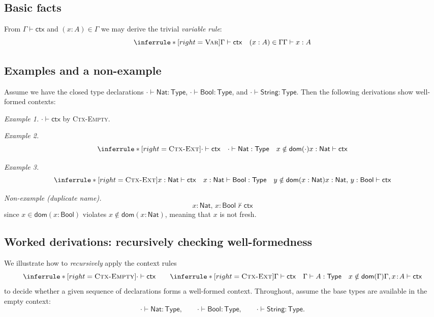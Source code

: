 \documentclass{article}
\newcommand{\Type}{\mathsf{Type}}
\newcommand{\Nat}{\mathsf{Nat}}
\newcommand{\Bool}{\mathsf{Bool}}
\newcommand{\String}{\mathsf{String}}
\newcommand{\emptyctx}{\cdot}              %
\newcommand{\ctx}{\mathsf{ctx}}            %
\newcommand{\judg}[3]{#1 \vdash #2 : #3}   %
\newcommand{\dom}{\mathsf{dom}}            %
\newcommand{\rulename}[1]{\textsc{#1}}
\begin{document}
\subsection*{Basic facts}
From \(\Gamma \vdash \ctx\) and \((x:A)\in\Gamma\) we may derive the trivial
\emph{variable rule}:
\[
\inferrule*[right=\rulename{Var}]{
\Gamma \vdash \ctx
\quad
(x:A)\in\Gamma
}{
\judg{\Gamma}{x}{A}
}
\]

\subsection*{Examples and a non-example}

Assume we have the closed type declarations \(\emptyctx \vdash \Nat:\Type\),
\(\emptyctx \vdash \Bool:\Type\), and \(\emptyctx \vdash \String:\Type\).
Then the following derivations show well-formed contexts:

\medskip
\noindent
\emph{Example 1.} \(\emptyctx \vdash \ctx\) by \rulename{Ctx-Empty}.

\medskip
\noindent
\emph{Example 2.}
\[
\inferrule*[right=\rulename{Ctx-Ext}]{
\emptyctx \vdash \ctx
\quad
\emptyctx \vdash \Nat:\Type
\quad
x \notin \dom(\emptyctx)
}{
x:\Nat \vdash \ctx
}
\]

\medskip
\noindent
\emph{Example 3.}
\[
\inferrule*[right=\rulename{Ctx-Ext}]{
x:\Nat \vdash \ctx
\quad
\judg{x:\Nat}{\Bool}{\Type}
\quad
y \notin \dom(x:\Nat)
}{
x:\Nat,\, y:\Bool \vdash \ctx
}
\]

\medskip
\noindent
\emph{Non-example (duplicate name).}
\[
x:\Nat,\, x:\Bool \not\vdash \ctx
\]
since $x \in \dom(x:\Bool)$ violates $x\notin\dom(x:\Nat)$, meaning that $x$ is not fresh.

\subsection*{Worked derivations: recursively checking well-formedness}

We illustrate how to \emph{recursively} apply the context rules
\[
\inferrule*[right=\rulename{Ctx-Empty}]{ }{\emptyctx \vdash \ctx}
\qquad
\inferrule*[right=\rulename{Ctx-Ext}]{\Gamma \vdash \ctx \quad \judg{\Gamma}{A}{\Type} \quad x \notin \dom(\Gamma)}{\Gamma,x\!:\!A \vdash \ctx}
\]
to decide whether a given sequence of declarations forms a well-formed context. Throughout, assume the base types are available in the empty context:
\[
\emptyctx \vdash \Nat:\Type,\qquad \emptyctx \vdash \Bool:\Type,\qquad \emptyctx \vdash \String:\Type.
\]
\end{document}
